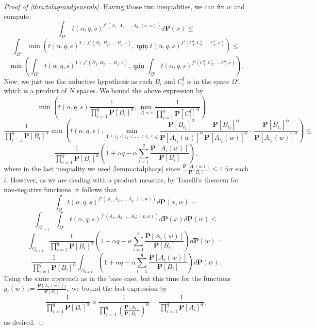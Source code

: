 \documentclass[11pt]{article}\usepackage{amsfonts}
\numberwithin{theorem}{subsection}
\newcommand{\prob}{\mathbf{P}}
\begin{document}
\begin{proof}[Proof of \cref{thm:talagrandgenerals}]
\noindent
Having those two inequalities, we can fix $w$ and compute:
$$
\int_{\Omega'}
t(\alpha, q, s)^{f^s(A_1, A_2, \ldots, A_q; (x,w))}d\prob(x)\le 
$$
$$
\int_{\Omega'}
\min\left(
t(\alpha, q, s)^{1+f^s(B_1, B_2, \ldots, B_q; x)},
\min_{_{|I|  =s}}
t(\alpha, q, s)^{
f^s(C^I_1, C^I_2, \ldots, C^I_q; x)
}
\right)\le 
$$
$$
\min\left(
\int_{\Omega'}
t(\alpha, q, s)^{1+f^s(B_1, B_2, \ldots, B_q;x)},
\min_{_{|I|  =s}}
\int_{\Omega'}
t(\alpha, q, s)^{
f^s(C^I_1, C^I_2, \ldots, C^I_q; x)
}
\right).
$$
Now, we just use the inductive hypothesis as each $B_i$ and $C^I_i$ is in the space $\Omega',$ which is a product of $N$ spaces. We bound the above expression by
$$
\min\left(
t(\alpha, q,s)
\frac{1}{\prod_{i=1}^q \prob[B_i]^\alpha}, 
\min_{|I| = s}
\frac{1}{\prod_{i=1}^q \prob[C^I_i]^\alpha}
\right) = 
$$
$$
\frac{1}{\prod_{i=1}^q \prob[B_i]^\alpha}
\min\left(
t(\alpha, q,s), 
\min_{1\le i_1<i_2<\ldots <i_s\le q}
\frac{\prob[B_{i_1}]^\alpha}{\prob[A_{i_1}(w)]^\alpha}
\frac{\prob[B_{i_2}]^\alpha}{\prob[A_{i_2}(w)]^\alpha}
\cdots
\frac{\prob[B_{i_s}]^\alpha}{\prob[A_{i_s}(w)]^\alpha}
\right)\le
$$
$$
\frac{1}{\prod_{i=1}^q \prob[B_i]^\alpha}
\left(
1 + \alpha q - \alpha\sum_{i=1}^q\frac{\prob[A_i(w)]}{\prob[B_i]}\right),
$$
where in the last inequality we used \cref{lemma:talphaqs} since $\frac{\prob[A_i(w)]}{\prob[B_i]}\le 1$ for each $i.$ However, as we are dealing with a product measure, by Tonelli's theorem for non-negative functions, it follows that  
$$
\int_{\Omega}
t(\alpha, q, s)^{f^s(A_1, A_2, \ldots, A_q; (x,w))}d\prob(x,w)= 
$$
$$
\int_{\Omega_{n+1}}\int_{\Omega'}
t(\alpha, q, s)^{f^s(A_1, A_2, \ldots, A_q; (x,w))}d\prob(x)d\prob(w)\le 
$$
$$
\int_{\Omega_{n+1}}
\frac{1}{\prod_{i=1}^q \prob[B_i]^\alpha}
\left(
1 + \alpha q - \alpha\sum_{i=1}^q\frac{\prob[A_i(w)]}{\prob[B_i]}
\right)
d\prob(w) = 
$$
$$
\frac{1}{\prod_{i=1}^q \prob[B_i]^\alpha}
\int_{\Omega_{n+1}}
\left(
1 + \alpha q - \alpha\sum_{i=1}^q\frac{\prob[A_i(w)]}{\prob[B_i]}
\right)
d\prob(w).
$$
Using the same approach as in the base case, but this time for the functions $g_i(w):=\frac{\prob[A_i(w)])}{\prob[B_i]},$ we bound the last expression by 
$$
\frac{1}{\prod_{i=1}^q \prob[B_i]^\alpha}\times 
\frac{1}{\prod_{i=1}^q \left(\frac{\prob[A_i]}{\prob[B_i]}\right)^\alpha} = 
\frac{1}{\prod_{i=1}^q \prob[A_i]^\alpha},
$$
as desired.
\end{proof}
\end{document}
